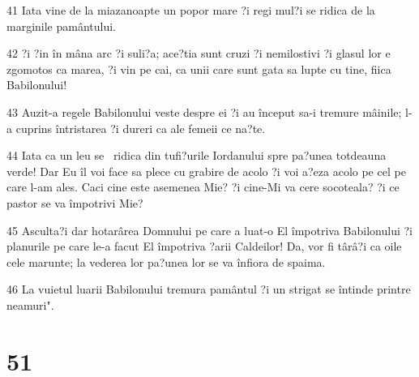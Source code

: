 \par 41 Iata vine de la miazanoapte un popor mare ?i regi mul?i se ridica de la marginile pamântului.
\par 42 ?i ?in în mâna arc ?i suli?a; ace?tia sunt cruzi ?i nemilostivi ?i glasul lor e zgomotos ca marea, ?i vin pe cai, ca unii care sunt gata sa lupte cu tine, fiica Babilonului!
\par 43 Auzit-a regele Babilonului veste despre ei ?i au început sa-i tremure mâinile; l-a cuprins întristarea ?i dureri ca ale femeii ce na?te.
\par 44 Iata ca un leu se  ridica din tufi?urile Iordanului spre pa?unea totdeauna verde! Dar Eu îl voi face sa plece cu grabire de acolo ?i voi a?eza acolo pe cel pe care l-am ales. Caci cine este asemenea Mie? ?i cine-Mi va cere socoteala? ?i ce pastor se va împotrivi Mie?
\par 45 Asculta?i dar hotarârea Domnului pe care a luat-o El împotriva Babilonului ?i planurile pe care le-a facut El împotriva ?arii Caldeilor! Da, vor fi târâ?i ca oile cele marunte; la vederea lor pa?unea lor se va înfiora de spaima.
\par 46 La vuietul luarii Babilonului tremura pamântul ?i un strigat se întinde printre neamuri".

\chapter{51}

